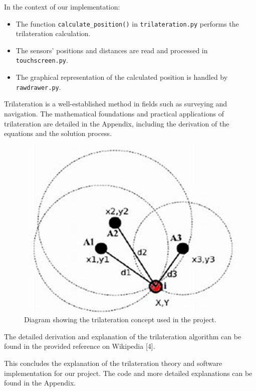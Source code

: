 \documentclass[12pt,a4paper]{article}
\begin{document}
In the context of our implementation:
\begin{itemize}
    \item The function \texttt{calculate\_position()} in \texttt{trilateration.py} performs the trilateration calculation.
    \item The sensors' positions and distances are read and processed in \texttt{touchscreen.py}.
    \item The graphical representation of the calculated position is handled by \texttt{rawdrawer.py}.
\end{itemize}

Trilateration is a well-established method in fields such as surveying and navigation. The mathematical foundations and practical applications of trilateration are detailed in the Appendix, including the derivation of the equations and the solution process.

\begin{figure}[!htp]
    \centering
    \includegraphics[scale=0.4]{../IoT Materials/article images/1-Trilateriation-diagram.png}
    \caption{Diagram showing the trilateration concept used in the project.}
\end{figure}

The detailed derivation and explanation of the trilateration algorithm can be found in the provided reference on Wikipedia [4].

This concludes the explanation of the trilateration theory and software implementation for our project. The code and more detailed explanations can be found in the Appendix.
\end{document}
